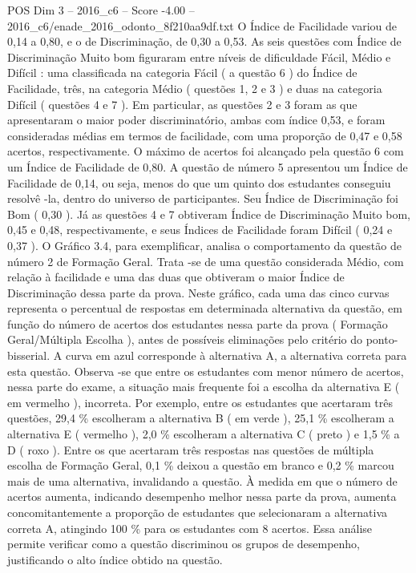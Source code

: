 \begin{textsample}{POS Dim 3 – 2016\_c6 – Score -4.00 – 2016\_c6/enade\_2016\_odonto\_8f210aa9df.txt}
O Índice de Facilidade variou de 0,14 a 0,80, e o de Discriminação, de 0,30 a 0,53.
As seis questões com Índice de Discriminação Muito bom figuraram entre níveis de dificuldade Fácil, Médio e Difícil : uma classificada na categoria Fácil ( a questão 6 ) do Índice de Facilidade, três, na categoria Médio ( questões 1, 2 e 3 ) e duas na categoria Difícil ( questões 4 e 7 ).
Em particular, as questões 2 e 3 foram as que apresentaram o maior poder discriminatório, ambas com índice 0,53, e foram consideradas médias em termos de facilidade, com uma proporção de 0,47 e 0,58 acertos, respectivamente.
O máximo de acertos foi alcançado pela questão 6 com um Índice de Facilidade de 0,80.
A questão de número 5 apresentou um Índice de Facilidade de 0,14, ou seja, menos do que um quinto dos estudantes conseguiu resolvê -la, dentro do universo de participantes.
Seu Índice de Discriminação foi Bom ( 0,30 ).
Já as questões 4 e 7 obtiveram Índice de Discriminação Muito bom, 0,45 e 0,48, respectivamente, e seus Índices de Facilidade foram Difícil ( 0,24 e 0,37 ).
O Gráfico 3.4, para exemplificar, analisa o comportamento da questão de número 2 de Formação Geral.
Trata -se de uma questão considerada Médio, com relação à facilidade e uma das duas que obtiveram o maior Índice de Discriminação dessa parte da prova.
Neste gráfico, cada uma das cinco curvas representa o percentual de respostas em determinada alternativa da questão, em função do número de acertos dos estudantes nessa parte da prova ( Formação Geral/Múltipla Escolha ), antes de possíveis eliminações pelo critério do ponto-bisserial.
A curva em azul corresponde à alternativa A, a alternativa correta para esta questão.
Observa -se que entre os estudantes com menor número de acertos, nessa parte do exame, a situação mais frequente foi a escolha da alternativa E ( em vermelho ), incorreta.
Por exemplo, entre os estudantes que acertaram três questões, 29,4 \% escolheram a alternativa B ( em verde ), 25,1 \% escolheram a alternativa E ( vermelho ), 2,0 \% escolheram a alternativa C ( preto ) e 1,5 \% a D ( roxo ).
Entre os que acertaram três respostas nas questões de múltipla escolha de Formação Geral, 0,1 \% deixou a questão em branco e 0,2 \% marcou mais de uma alternativa, invalidando a questão.
À medida em que o número de acertos aumenta, indicando desempenho melhor nessa parte da prova, aumenta concomitantemente a proporção de estudantes que selecionaram a alternativa correta A, atingindo 100 \% para os estudantes com 8 acertos.
Essa análise permite verificar como a questão discriminou os grupos de desempenho, justificando o alto índice obtido na questão.

\end{textsample}
